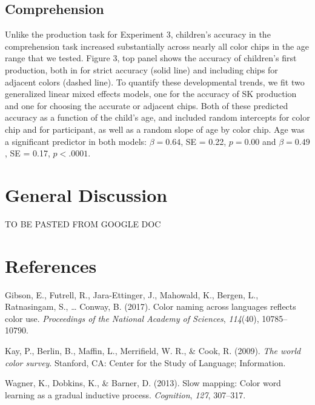 \documentclass[,man,floatsintext]{apa6}
\theoremstyle{definition}
\theoremstyle{definition}
\theoremstyle{definition}
\theoremstyle{remark}
\begin{document}
\subsection{Comprehension}\label{comprehension-1}

Unlike the production task for Experiment 3, children's accuracy in the
comprehension task increased substantially across nearly all color chips
in the age range that we tested. Figure 3, top panel shows the accuracy
of children's first production, both in for strict accuracy (solid line)
and including chips for adjacent colors (dashed line). To quantify these
developmental trends, we fit two generalized linear mixed effects
models, one for the accuracy of SK production and one for choosing the
accurate or adjacent chips. Both of these predicted accuracy as a
function of the child's age, and included random intercepts for color
chip and for participant, as well as a random slope of age by color
chip. Age was a significant predictor in both models: \(\beta = 0.64\),
SE = 0.22, \(p = 0.00\) and \(\beta = 0.49\), SE = 0.17, \(p < .0001\).

\section{General Discussion}\label{general-discussion}

TO BE PASTED FROM GOOGLE DOC

\newpage

\section{References}\label{references}

\begingroup
\setlength{\parindent}{-0.5in} \setlength{\leftskip}{0.5in}

\hypertarget{refs}{}
\hypertarget{ref-gibson2017}{}
Gibson, E., Futrell, R., Jara-Ettinger, J., Mahowald, K., Bergen, L.,
Ratnasingam, S., \ldots{} Conway, B. (2017). Color naming across
languages reflects color use. \emph{Proceedings of the National Academy
of Sciences}, \emph{114}(40), 10785--10790.

\hypertarget{ref-berlin2009}{}
Kay, P., Berlin, B., Maffin, L., Merrifield, W. R., \& Cook, R. (2009).
\emph{The world color survey}. Stanford, CA: Center for the Study of
Language; Information.

\hypertarget{ref-wagner2013}{}
Wagner, K., Dobkins, K., \& Barner, D. (2013). Slow mapping: Color word
learning as a gradual inductive process. \emph{Cognition}, \emph{127},
307--317.

\endgroup
\end{document}
